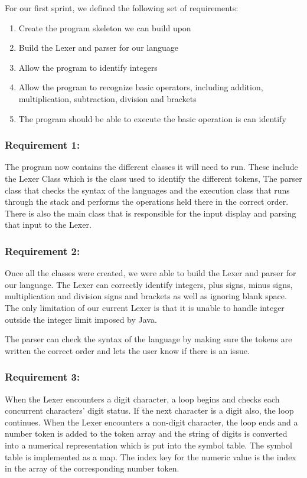 \documentclass[a4paper, oneside, 11pt]{report}
\begin{document}
For our first sprint, we defined the following set of requirements: 

\begin{enumerate}
\item Create the program skeleton we can build upon 
\item Build the Lexer and parser for our language 
\item Allow the program to identify integers 
\item Allow the program to recognize basic operators, including addition, multiplication, subtraction, division and brackets 
\item The program should be able to execute the basic operation is can identify 
\end{enumerate}

\subsubsection{Requirement 1:}

The program now contains the different classes it will need to run. These include the Lexer Class which is the class used to identify the different tokens, The parser class that checks the syntax of the languages and the execution class that runs through the stack and performs the operations held there in the correct order. There is also the main class that is responsible for the input display and parsing that input to the Lexer. 

\subsubsection{Requirement 2:}

Once all the classes were created, we were able to build the Lexer and parser for our language. The Lexer can correctly identify integers, plus signs, minus signs, multiplication and division signs and brackets as well as ignoring blank space. The only limitation of our current Lexer is that it is unable to handle integer outside the integer limit imposed by Java. 

The parser can check the syntax of the language by making sure the tokens are written the correct order and lets the user know if there is an issue. 

\subsubsection{Requirement 3:}

When the Lexer encounters a digit character, a loop begins and checks each concurrent characters’ digit status. If the next character is a digit also, the loop continues. When the Lexer encounters a non-digit character, the loop ends and a number token is added to the token array and the string of digits is converted into a numerical representation which is put into the symbol table. The symbol table is implemented as a map. The index key for the numeric value is the index in the array of the corresponding number token. 
\end{document}
